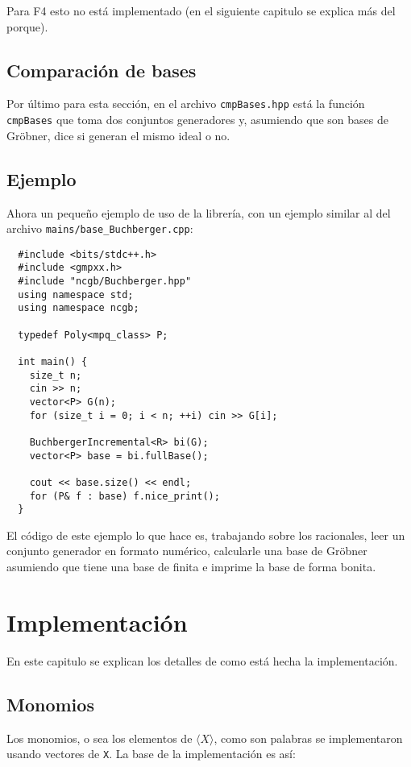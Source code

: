 \documentclass[12pt]{report}
\theoremstyle{customstyle}
\theoremstyle{factstyle}
\begin{document}
Para F4 esto no está implementado (en el siguiente capitulo se explica más del porque).


\section{Comparación de bases}

Por último para esta sección, en el archivo \texttt{cmpBases.hpp} está la función \texttt{cmpBases} que toma dos conjuntos generadores y, asumiendo que son bases de Gröbner, dice si generan el mismo ideal o no.

\section{Ejemplo}

Ahora un pequeño ejemplo de uso de la librería, con un ejemplo similar al del archivo \texttt{mains/base\_Buchberger.cpp}:

\begin{verbatim}
  #include <bits/stdc++.h>
  #include <gmpxx.h>
  #include "ncgb/Buchberger.hpp"
  using namespace std;
  using namespace ncgb;

  typedef Poly<mpq_class> P;

  int main() {
    size_t n;
    cin >> n;
    vector<P> G(n);
    for (size_t i = 0; i < n; ++i) cin >> G[i];

    BuchbergerIncremental<R> bi(G);
    vector<P> base = bi.fullBase();

    cout << base.size() << endl;
    for (P& f : base) f.nice_print();
  }
\end{verbatim}

El código de este ejemplo lo que hace es, trabajando sobre los racionales, leer un conjunto generador en formato numérico, calcularle una base de Gröbner asumiendo que tiene una base de finita e imprime la base de forma bonita.

\chapter{Implementación}

En este capitulo se explican los detalles de como está hecha la implementación.


\section{Monomios}

Los monomios, o sea los elementos de $⟨X⟩$, como son palabras se implementaron usando vectores de \texttt{X}. La base de la implementación es así:
\end{document}
